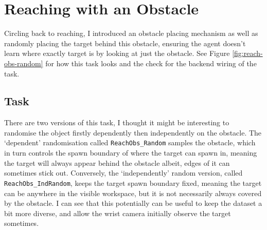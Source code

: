 \section{Reaching with an Obstacle}
Circling back to reaching, I introduced an obstacle placing mechanism as well as randomly placing the target behind this obstacle, ensuring the agent doesn't learn where exactly target is by looking at just the obstacle\todo[color=purple]. See Figure \ref{fig:reach-obs-random} for how this task looks and the check  for the backend wiring of the task.

\subsection{Task}\label{subsec:ro-creating-the-task}
There are two versions of this task, I thought it might be interesting to randomise the object firstly dependently then independently on the obstacle. The `dependent' randomisation called \verb|ReachObs_Random| samples the obstacle, which in turn controls the spawn boundary of where the target can spawn in, meaning the target will always appear behind the obstacle albeit, edges of it can sometimes stick out. Conversely, the `independently' random version, called \verb|ReachObs_IndRandom|, keeps the target spawn boundary fixed, meaning the target can be anywhere in the visible workspace, but it is not necessarily always covered by the obstacle. I can see that this potentially can be useful to keep the dataset a bit more diverse, and allow the wrist camera initially observe the target sometimes.


